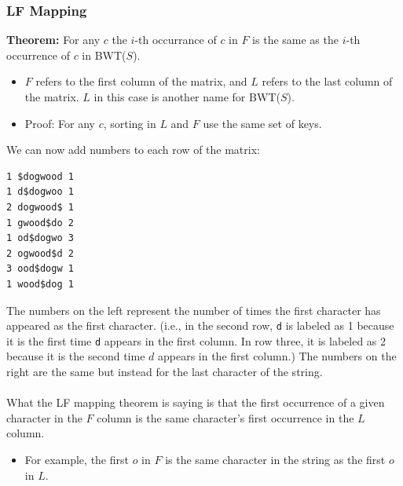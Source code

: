 \documentclass[10pt]{article}
\begin{document}
\subsubsection*{LF Mapping}
\textbf{Theorem:} For any $c$ the $i$-th occurrance of $c$ in $F$ is the same as the $i$-th occurrence of $c$ in BWT($S$).
\begin{itemize}
    \item $F$ refers to the first column of the matrix, and $L$ refers to the last column of the matrix.  $L$ in this case is another name for BWT($S$).
    \item Proof: For any $c$, sorting in $L$ and $F$ use the same set of keys.
\end{itemize}
We can now add numbers to each row of the matrix:
\begin{verbatim}
1 $dogwood 1
1 d$dogwoo 1
2 dogwood$ 1
1 gwood$do 2
1 od$dogwo 3
2 ogwood$d 2
3 ood$dogw 1 
1 wood$dog 1
\end{verbatim}
The numbers on the left represent the number of times the first character has appeared as the first character.  (i.e., in the second row, \texttt{d} is labeled as 1 because it is the first time \texttt{d} appears in the first column.  In row three, it is labeled as 2 because it is the second time $d$ appears in the first column.) The numbers on the right are the same but instead for the last character of the string.\\\\
What the LF mapping theorem is saying is that the first occurrence of a given character in the $F$ column is the same character's first occurrence in the $L$ column.
\begin{itemize}
    \item For example, the first $o$ in $F$ is the same character in the string as the first $o$ in $L$.
\end{itemize}
\end{document}
